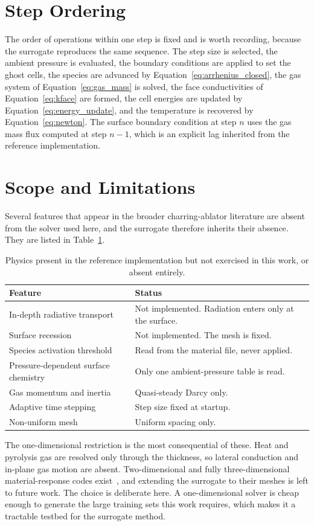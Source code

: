 \documentclass[11pt]{report}
\begin{document}
\section{Step Ordering}

The order of operations within one step is fixed and is worth recording, because
the surrogate reproduces the same sequence. The step size is selected, the ambient
pressure is evaluated, the boundary conditions are applied to set the ghost cells,
the species are advanced by Equation~\eqref{eq:arrhenius_closed}, the gas system of
Equation~\eqref{eq:gas_mass} is solved, the face conductivities of
Equation~\eqref{eq:kface} are formed, the cell energies are updated by
Equation~\eqref{eq:energy_update}, and the temperature is recovered by
Equation~\eqref{eq:newton}. The surface boundary condition at step $n$ uses the
gas mass flux computed at step $n-1$, which is an explicit lag inherited from the
reference implementation.

\section{Scope and Limitations}

Several features that appear in the broader charring-ablator literature are
absent from the solver used here, and the surrogate therefore inherits their
absence. They are listed in Table~\ref{tab:limitations}.

\begin{table}[H]
\centering
\caption{Physics present in the reference implementation but not exercised in
this work, or absent entirely.}
\label{tab:limitations}
\begin{tabular}{ll}
\toprule
Feature & Status \\
\midrule
In-depth radiative transport & Not implemented. Radiation enters only at the surface. \\
Surface recession & Not implemented. The mesh is fixed. \\
Species activation threshold & Read from the material file, never applied. \\
Pressure-dependent surface chemistry & Only one ambient-pressure table is read. \\
Gas momentum and inertia & Quasi-steady Darcy only. \\
Adaptive time stepping & Step size fixed at startup. \\
Non-uniform mesh & Uniform spacing only. \\
\bottomrule
\end{tabular}
\end{table}

The one-dimensional restriction is the most consequential of these. Heat and
pyrolysis gas are resolved only through the thickness, so lateral conduction and
in-plane gas motion are absent. Two-dimensional and fully three-dimensional
material-response codes exist~\cite{chen2001titan,amar2016char,lachaud2014pato},
and extending the surrogate to their meshes is left to future work. The choice is
deliberate here. A one-dimensional solver is cheap enough to generate the large
training sets this work requires, which makes it a tractable testbed for the
surrogate method.



\end{document}
